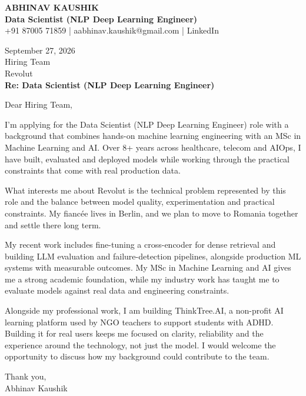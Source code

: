 \documentclass[10pt,a4paper]{article}
\begin{document}
\begin{center}
{\Large\bfseries ABHINAV KAUSHIK}\\[2pt]
{\bfseries Data Scientist (NLP Deep Learning Engineer)}\\[2pt]
+91 87005 71859 \quad | \quad aabhinav.kaushik@gmail.com \quad | \quad LinkedIn
\end{center}
\vspace{8pt}
September 27, 2026\\[6pt]
Hiring Team\\
Revolut\\[4pt]
\textbf{Re: Data Scientist (NLP Deep Learning Engineer)}

Dear Hiring Team,

I’m applying for the Data Scientist (NLP Deep Learning Engineer) role with a background that combines hands-on machine learning engineering with an MSc in Machine Learning and AI. Over 8+ years across healthcare, telecom and AIOps, I have built, evaluated and deployed models while working through the practical constraints that come with real production data.

What interests me about Revolut is the technical problem represented by this role and the balance between model quality, experimentation and practical constraints. My fiancée lives in Berlin, and we plan to move to Romania together and settle there long term.

My recent work includes fine-tuning a cross-encoder for dense retrieval and building LLM evaluation and failure-detection pipelines, alongside production ML systems with measurable outcomes. My MSc in Machine Learning and AI gives me a strong academic foundation, while my industry work has taught me to evaluate models against real data and engineering constraints.

Alongside my professional work, I am building ThinkTree.AI, a non-profit AI learning platform used by NGO teachers to support students with ADHD. Building it for real users keeps me focused on clarity, reliability and the experience around the technology, not just the model. I would welcome the opportunity to discuss how my background could contribute to the team.

Thank you,\\
Abhinav Kaushik
\end{document}
